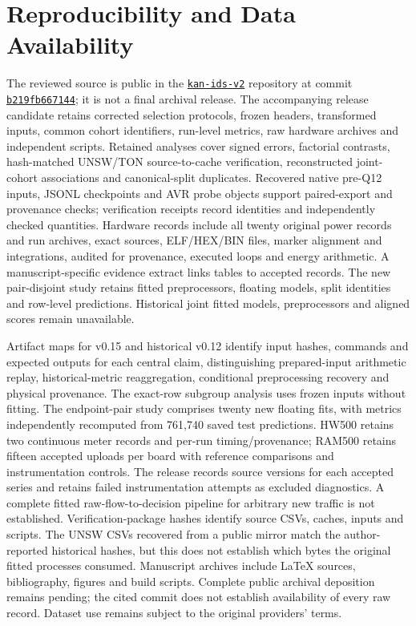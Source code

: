 \documentclass{ieeeaccess}
\begin{document}
\section*{Reproducibility and Data Availability}
The reviewed source is public in the \href{https://github.com/emanuelepiodebernardis/kan-ids-v2}{\texttt{kan-ids-v2}} repository at commit \href{https://github.com/emanuelepiodebernardis/kan-ids-v2/commit/b219fb6671442e2e5dfcda5b6ea49a04d57e7960}{\texttt{b219fb667144}}; it is not a final archival release. The accompanying release candidate retains corrected selection protocols, frozen headers, transformed inputs, common cohort identifiers, run-level metrics, raw hardware archives and independent scripts. Retained analyses cover signed errors, factorial contrasts, hash-matched UNSW/TON source-to-cache verification, reconstructed joint-cohort associations and canonical-split duplicates. Recovered native pre-Q12 inputs, JSONL checkpoints and AVR probe objects support paired-export and provenance checks; verification receipts record identities and independently checked quantities. Hardware records include all twenty original power records and run archives, exact sources, ELF/HEX/BIN files, marker alignment and integrations, audited for provenance, executed loops and energy arithmetic. A manuscript-specific evidence extract links tables to accepted records. The new pair-disjoint study retains fitted preprocessors, floating models, split identities and row-level predictions. Historical joint fitted models, preprocessors and aligned scores remain unavailable.

Artifact maps for v0.15 and historical v0.12 identify input hashes, commands and expected outputs for each central claim, distinguishing prepared-input arithmetic replay, historical-metric reaggregation, conditional preprocessing recovery and physical provenance. The exact-row subgroup analysis uses frozen inputs without fitting. The endpoint-pair study comprises twenty new floating fits, with metrics independently recomputed from 761,740 saved test predictions. HW500 retains two continuous meter records and per-run timing/provenance; RAM500 retains fifteen accepted uploads per board with reference comparisons and instrumentation controls. The release records source versions for each accepted series and retains failed instrumentation attempts as excluded diagnostics. A complete fitted raw-flow-to-decision pipeline for arbitrary new traffic is not established. Verification-package hashes identify source CSVs, caches, inputs and scripts. The UNSW CSVs recovered from a public mirror match the author-reported historical hashes, but this does not establish which bytes the original fitted processes consumed. Manuscript archives include LaTeX sources, bibliography, figures and build scripts. Complete public archival deposition remains pending; the cited commit does not establish availability of every raw record. Dataset use remains subject to the original providers' terms.
\end{document}
